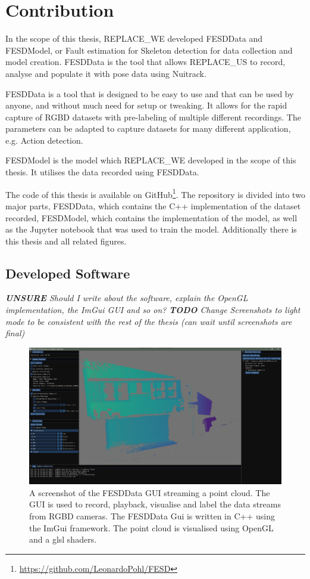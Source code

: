 \section{Contribution}
\label{sec:contribution}

In the scope of this thesis, REPLACE_WE developed FESDData and FESDModel, or Fault estimation for Skeleton detection for data collection and model creation. FESDData is the tool that allows REPLACE_US to record, analyse and populate it with pose data using Nuitrack. 

FESDData is a tool that is designed to be easy to use and that can be used by anyone, and without much need for setup or tweaking. It allows for the rapid capture of RGBD datasets with pre-labeling of multiple different recordings. The parameters can be adapted to capture datasets for many different application, e.g. Action detection.

FESDModel is the model which REPLACE_WE developed in the scope of this thesis. It utilises the data recorded using FESDData.

The code of this thesis is available on GitHub\footnote{\url{https://github.com/LeonardoPohl/FESD}}. The repository is divided into two major parts, FESDData, which contains the C++ implementation of the dataset recorded, FESDModel, which contains the implementation of the model, as well as the Jupyter notebook that was used to train the model. Additionally there is this thesis and all related figures.

\subsection{Developed Software}

\textit{\textbf{UNSURE} Should I write about the software, explain the OpenGL implementation, the ImGui GUI and so on?}
\textit{\textbf{TODO} Change Screenshots to light mode to be consistent with the rest of the thesis (can wait until screenshots are final)}

\begin{figure}[ht]
  \centering
  \includegraphics[width=\linewidth]{figures/FESD/all.png}
  \caption[FESDData GUI]{A screenshot of the FESDData GUI streaming a point cloud. The GUI is used to record, playback, visualise and label the data streams from RGBD cameras. The FESDData Gui is written in C++ using the ImGui framework. The point cloud is visualised using OpenGL and a glsl shaders.}
  \label{fig:stream_gui}
\end{figure}

